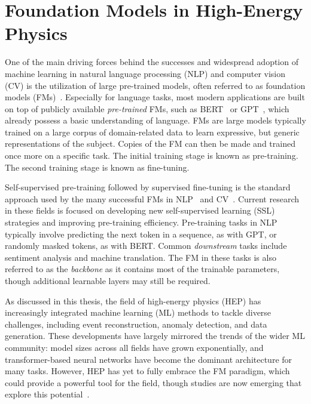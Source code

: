 \chapter{Foundation Models in High-Energy Physics}
\label{ch:foundation_models}

One of the main driving forces behind the successes and widespread adoption of machine learning in natural language processing (NLP) and computer vision (CV) is the utilization of large pre-trained models, often referred to as foundation models (FMs)~\cite{OpportunitiesRisksFoundation}.
Especially for language tasks, most modern applications are built on top of publicly available \textit{pre-trained} FMs, such as BERT~\cite{BERT} or GPT~\cite{GPT, GPT2}, which already possess a basic understanding of language.
FMs are large models typically trained on a large corpus of domain-related data to learn expressive, but generic representations of the subject.
Copies of the FM can then be made and trained once more on a specific task.
The initial training stage is known as pre-training.
The second training stage is known as fine-tuning.

Self-supervised pre-training followed by supervised fine-tuning is the standard approach used by the many successful FMs in NLP~\cite{BERT, GPT, GPT2, BART, LanguageModelsAre} and CV~\cite{DINO, Dalle, Flamingo, MAE, BEIT, IJepa}.
Current research in these fields is focused on developing new self-supervised learning (SSL) strategies and improving pre-training efficiency.
Pre-training tasks in NLP typically involve predicting the next token in a sequence, as with GPT, or randomly masked tokens, as with BERT.
Common \textit{downstream} tasks include sentiment analysis and machine translation. The FM in these tasks is also referred to as the \textit{backbone} as it contains most of the trainable parameters, though additional learnable layers may still be required.

As discussed in this thesis, the field of high-energy physics (HEP) has increasingly integrated machine learning (ML) methods to tackle diverse challenges, including event reconstruction, anomaly detection, and data generation.
These developments have largely mirrored the trends of the wider ML community: model sizes across all fields have grown exponentially, and transformer-based neural networks have become the dominant architecture for many tasks.
However, HEP has yet to fully embrace the FM paradigm, which could provide a powerful tool for the field, though studies are now emerging that explore this potential~\cite{MPM, MPM2, ReSim, JapanPretrain, Omnijet, Omnilearn, LargeScalePretraining, JetCLR}.

